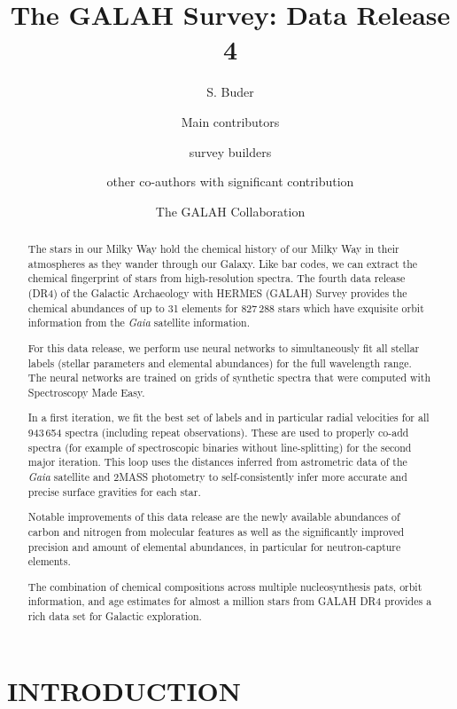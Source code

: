 \documentclass[
  journal=pasa,
  manuscript=research-paper, %
  year=2023,
  volume=37
]{cup-journal}
\title{The GALAH Survey: Data Release 4}
\author{S. Buder}
\affiliation{Research School of Astronomy \& Astrophysics, Australian National University, Canberra, ACT 2611, Australia}
\affiliation{ARC Centre of Excellence for All Sky Astrophysics in 3 Dimensions (ASTRO 3D), Australia}
\author{Main contributors}
\author{survey builders}
\author{other co-authors with significant contribution}
\author{The GALAH Collaboration}
\newcommand{\Gaia}{\textit{Gaia}\xspace}
\begin{document}
\begin{abstract}

The stars in our Milky Way hold the chemical history of our Milky Way in their atmospheres as they wander through our Galaxy. Like bar codes, we can extract the chemical fingerprint of stars from high-resolution spectra. The fourth data release (DR4) of the Galactic Archaeology with HERMES (GALAH) Survey provides the chemical abundances of up to 31 elements for 827\,288 stars which have exquisite orbit information from the \Gaia satellite information.

For this data release, we perform use neural networks to simultaneously fit all stellar labels (stellar parameters and elemental abundances) for the full wavelength range. The neural networks are trained on grids of synthetic spectra that were computed with Spectroscopy Made Easy.

In a first iteration, we fit the best set of labels and in particular radial velocities for all 943\,654 spectra (including repeat observations). These are used to properly co-add spectra (for example of spectroscopic binaries without line-splitting) for the second major iteration. This loop uses the distances inferred from astrometric data of the \Gaia satellite and 2MASS photometry to self-consistently infer more accurate and precise surface gravities for each star.

Notable improvements of this data release are the newly available abundances of carbon and nitrogen from molecular features as well as the significantly improved precision and amount of elemental abundances, in particular for neutron-capture elements.

The combination of chemical compositions across multiple nucleosynthesis pats, orbit information, and age estimates for almost a million stars from GALAH DR4 provides a rich data set for Galactic exploration.

\end{abstract}

\section{INTRODUCTION}
\label{sec:introduction}
\end{document}
